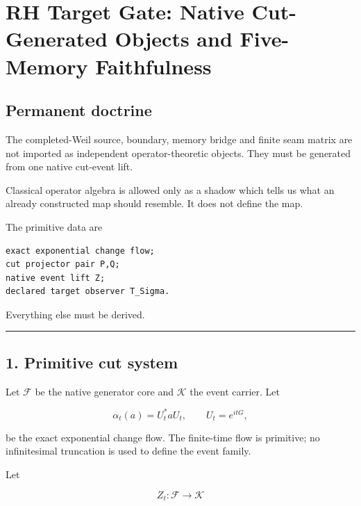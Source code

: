 \hypertarget{rh-target-gate-native-cut-generated-objects-and-five-memory-faithfulness}{%
\chapter{RH Target Gate: Native Cut-Generated Objects and Five-Memory Faithfulness}\label{rh-target-gate-native-cut-generated-objects-and-five-memory-faithfulness}}

\hypertarget{permanent-doctrine}{%
\section{Permanent doctrine}\label{permanent-doctrine}}

The completed-Weil source, boundary, memory bridge and finite seam matrix are
not imported as independent operator-theoretic objects. They must be generated
from one native cut-event lift.

Classical operator algebra is allowed only as a shadow which tells us what an
already constructed map should resemble. It does not define the map.

The primitive data are

\begin{verbatim}
exact exponential change flow;
cut projector pair P,Q;
native event lift Z;
declared target observer T_Sigma.
\end{verbatim}

Everything else must be derived.

\begin{center}\rule{0.5\linewidth}{0.5pt}\end{center}

\hypertarget{primitive-cut-system}{%
\section{1. Primitive cut system}\label{primitive-cut-system}}

Let \(\mathcal F\) be the native generator core and \(\mathcal K\) the event
carrier. Let

\[
\alpha_t(a)=U_t^*aU_t,
\qquad
U_t=e^{itG},
\]

be the exact exponential change flow. The finite-time flow is primitive; no
infinitesimal truncation is used to define the event family.

Let

\[
Z_t:\mathcal F\longrightarrow\mathcal K
\]

